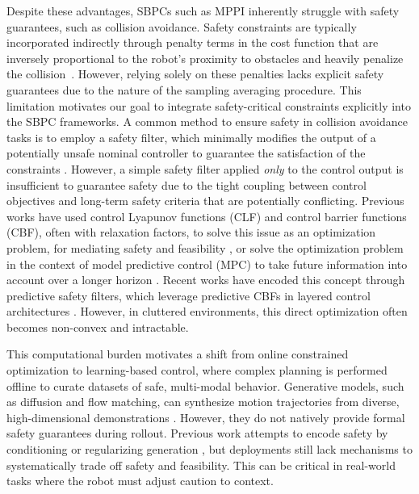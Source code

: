 \documentclass[letterpaper, 10 pt, conference]{ieeeconf}
\newcommand{\note}[2][NOTE]{\vspace{3 mm}\par \noindent \framebox{\color{red} \begin{minipage}[c]{0.97 \hsize} {\bf #1:} #2 \end{minipage}}\vspace{3 mm}\par}
\begin{document}
Despite these advantages, SBPCs such as MPPI inherently struggle with safety guarantees, such as collision avoidance. Safety constraints are typically incorporated indirectly through penalty terms in the cost function that are inversely proportional to the robot's proximity to obstacles and heavily penalize the collision~\cite{williams2017model, mohamed2023gp}. However, relying solely on these penalties lacks explicit safety guarantees due to the nature of the sampling averaging procedure. This limitation motivates our goal to integrate safety-critical constraints explicitly into the SBPC frameworks.
A common method to ensure safety in collision avoidance tasks is to employ a safety filter, which minimally modifies the output of a potentially unsafe nominal controller to guarantee the satisfaction of the constraints \cite{ames2014cbf}. However, a simple safety filter applied \textit{only} to the control output is insufficient to guarantee safety due to the tight coupling between control objectives and long-term safety criteria that are potentially conflicting. Previous works have used control Lyapunov functions (CLF) and control barrier functions (CBF), often with relaxation factors, to solve this issue as an optimization problem, for mediating safety and feasibility \cite{ames2016control, zeng2021enhancing}, or solve the optimization problem in the context of model predictive control (MPC) to take future information into account over a longer horizon \cite{zeng2021safety}. Recent works have encoded this concept through predictive safety filters, which leverage predictive CBFs in layered control architectures \cite{compton2024learning}. However, in cluttered environments, this direct optimization often becomes non-convex and intractable.

This computational burden motivates a shift from online constrained optimization to learning-based control, where complex planning is performed offline to curate datasets of safe, multi-modal behavior. Generative models, such as diffusion and flow matching, can synthesize motion trajectories from diverse, high-dimensional demonstrations \cite{kurtz2025generative, chi2023diffusion}. However, they do not natively provide formal safety guarantees during rollout. Previous work attempts to encode safety by conditioning or regularizing generation \cite{dai2025safefm, carvalho2023mpdiffusion}, but deployments still lack mechanisms to systematically trade off safety and feasibility. This can be critical in real-world tasks where the robot must adjust caution to context.
\end{document}
